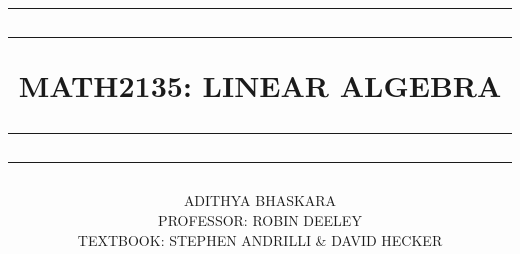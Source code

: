 \title{

    \rule{15cm}{1.6pt}\vspace*{-\baselineskip}\vspace*{2pt}
    \rule{15cm}{0.4pt}
	
	\vspace{0.75\baselineskip}
		
	\Huge{MATH2135: LINEAR ALGEBRA\\\vspace{3mm}}

	\rule{15cm}{0.4pt}\vspace*{-\baselineskip}\vspace{3.2pt}
	\rule{15cm}{1.6pt}

}

\author{ADITHYA BHASKARA\\\vspace{1em}\small{PROFESSOR: ROBIN DEELEY}\\\vspace{1em}\small{TEXTBOOK: STEPHEN ANDRILLI \& DAVID HECKER}}

\date{}